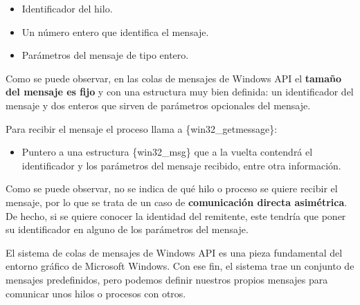 \begin{Shaded}
\begin{Highlighting}[]
\OperatorTok{(}
\OperatorTok{,} 
\OperatorTok{,} 
\OperatorTok{,} 
\OperatorTok{);}
\end{Highlighting}
\end{Shaded}

\begin{itemize}
\item
  Identificador del hilo.
\item
  Un número entero que identifica el mensaje.
\item
  Parámetros del mensaje de tipo entero.
\end{itemize}

Como se puede observar, en las colas de mensajes de Windows API el
\textbf{tamaño del mensaje es fijo} y con una estructura muy bien
definida: un identificador del mensaje y dos enteros que sirven de
parámetros opcionales del mensaje.

Para recibir el mensaje el proceso llama a \{win32\_getmessage\}:

\begin{Shaded}
\begin{Highlighting}[]
\OperatorTok{(}
\OperatorTok{,} 
\OperatorTok{,}
\OperatorTok{,}
\OperatorTok{);}
\end{Highlighting}
\end{Shaded}

\begin{itemize}
\item
  Puntero a una estructura \{win32\_msg\} que a la vuelta contendrá el
  identificador y los parámetros del mensaje recibido, entre otra
  información.
\end{itemize}

Como se puede observar, no se indica de qué hilo o proceso se quiere
recibir el mensaje, por lo que se trata de un caso de
\textbf{comunicación directa asimétrica}. De hecho, si se quiere conocer
la identidad del remitente, este tendría que poner su identificador en
alguno de los parámetros del mensaje.

El sistema de colas de mensajes de Windows API es una pieza fundamental
del entorno gráfico de Microsoft Windows. Con ese fin, el sistema trae
un conjunto de mensajes predefinidos, pero podemos definir nuestros
propios mensajes para comunicar unos hilos o procesos con otros.

